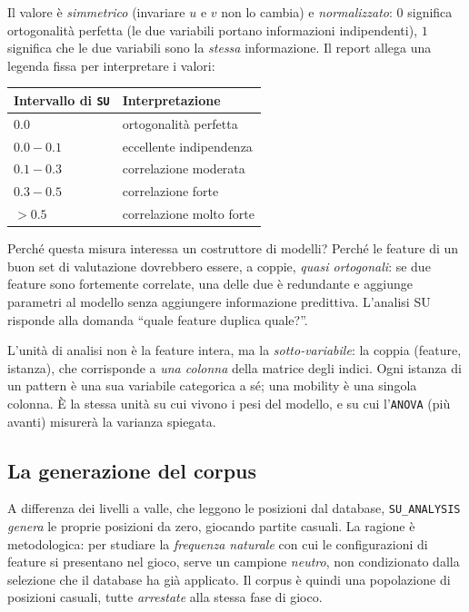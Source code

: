 Il valore è \emph{simmetrico} (invariare $u$ e $v$ non lo cambia) e
\emph{normalizzato}: $0$ significa ortogonalità perfetta (le due variabili
portano informazioni indipendenti), $1$ significa che le due variabili sono
la \emph{stessa} informazione. Il report allega una legenda fissa per
interpretare i valori:

\begin{center}
\small
\begin{tabular}{ll}
\toprule
Intervallo di \texttt{SU} & Interpretazione \\
\midrule
$0.0$            & ortogonalità perfetta \\
$0.0 - 0.1$      & eccellente indipendenza \\
$0.1 - 0.3$      & correlazione moderata \\
$0.3 - 0.5$      & correlazione forte \\
$> 0.5$          & correlazione molto forte \\
\bottomrule
\end{tabular}
\end{center}

Perché questa misura interessa un costruttore di modelli? Perché le feature di
un buon set di valutazione dovrebbero essere, a coppie, \emph{quasi
ortogonali}: se due feature sono fortemente correlate, una delle due è
redundante e aggiunge parametri al modello senza aggiungere informazione
predittiva. L'analisi SU risponde alla domanda ``quale feature duplica
quale?''.

L'unità di analisi non è la feature intera, ma la \emph{sotto-variabile}:
la coppia (feature, istanza), che corrisponde a \emph{una colonna} della
matrice degli indici. Ogni istanza di un pattern è una sua variabile
categorica a sé; una mobility è una singola colonna. È la stessa unità su cui
vivono i pesi del modello, e su cui l'\texttt{ANOVA} (più avanti) misurerà la
varianza spiegata.

\subsection{La generazione del corpus}

A differenza dei livelli a valle, che leggono le posizioni dal database,
\texttt{SU\_ANALYSIS} \emph{genera} le proprie posizioni da zero, giocando
partite casuali. La ragione è metodologica: per studiare la \emph{frequenza
naturale} con cui le configurazioni di feature si presentano nel gioco, serve
un campione \emph{neutro}, non condizionato dalla selezione che il database
ha già applicato. Il corpus è quindi una popolazione di posizioni casuali,
tutte \emph{arrestate} alla stessa fase di gioco.

